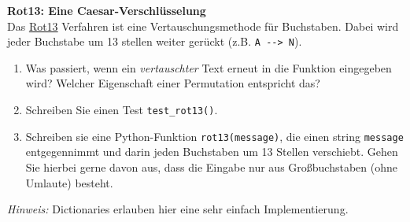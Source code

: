 \textbf{Rot13: Eine Caesar-Verschlüsselung}\\
Das \href{https://de.wikipedia.org/wiki/ROT13}{Rot13} Verfahren ist eine Vertauschungsmethode für Buchstaben. Dabei wird jeder Buchstabe um 13 stellen weiter gerückt (z.B. \verb|A --> N|).

\begin{enumerate}
	\item Was passiert, wenn ein \textit{vertauschter} Text erneut in die Funktion eingegeben wird? Welcher Eigenschaft einer Permutation entspricht das?
	\item Schreiben Sie einen Test \verb|test_rot13()|.
	\item Schreiben sie eine Python-Funktion \verb|rot13(message)|, die einen string \texttt{message} entgegennimmt und darin jeden Buchstaben um 13 Stellen verschiebt.
	Gehen Sie hierbei gerne davon aus, dass die Eingabe nur aus Großbuchstaben (ohne Umlaute) besteht. 
\end{enumerate}

\textit{Hinweis: } Dictionaries erlauben hier eine sehr einfach Implementierung.